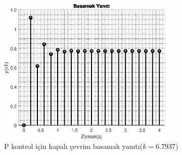 \begin{figure}[!htb]
    \centering
    \includegraphics[width=0.75\textwidth]{img/lec7_step2}
    \caption{P kontrol için kapalı çevrim basamak yanıtı($k=6.7937$)}
    \label{fig:lec7_step2}
\end{figure}



